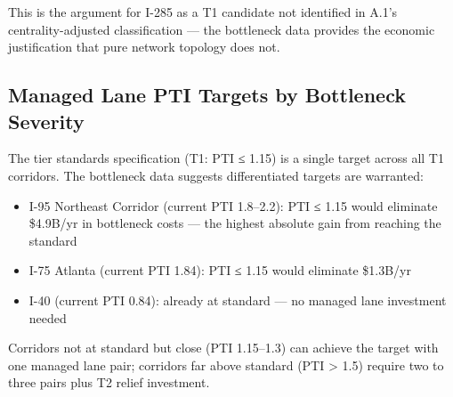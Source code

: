 This is the argument for I-285 as a T1 candidate not identified in A.1's centrality-adjusted classification --- the bottleneck data provides the economic justification that pure network topology does not.

\subsection{Managed Lane PTI Targets by Bottleneck Severity}

The tier standards specification (T1: PTI ≤ 1.15) is a single target across all T1 corridors. The bottleneck data suggests differentiated targets are warranted:

\begin{itemize}
\item I-95 Northeast Corridor (current PTI 1.8--2.2): PTI ≤ 1.15 would eliminate \$4.9B/yr in bottleneck costs --- the highest absolute gain from reaching the standard
\item I-75 Atlanta (current PTI 1.84): PTI ≤ 1.15 would eliminate \$1.3B/yr
\item I-40 (current PTI 0.84): already at standard --- no managed lane investment needed
\end{itemize}

Corridors not at standard but close (PTI 1.15--1.3) can achieve the target with one managed lane pair; corridors far above standard (PTI > 1.5) require two to three pairs plus T2 relief investment.
